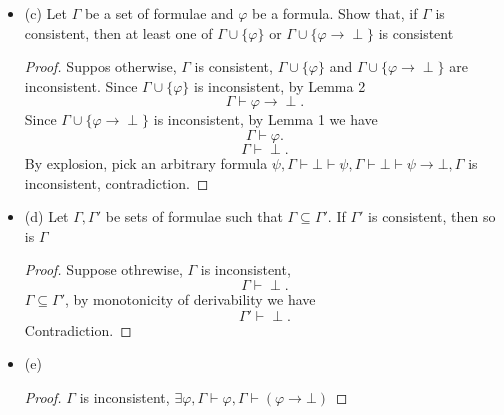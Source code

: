 \documentclass{article}
\begin{document}
\begin{itemize}
\begin{proof}
\begin{enumerate}
            \item $\Gamma \vdash \varphi \rightarrow \psi$
            \item $\Gamma \vdash \varphi \rightarrow (\psi \rightarrow \perp)$
            \item $\Gamma \vdash (\varphi \rightarrow (\psi \rightarrow \perp)) \rightarrow ((\varphi \rightarrow \psi) \rightarrow (\varphi \rightarrow \perp))$ (Ax 2)
            \item $\Gamma \vdash (\varphi \rightarrow \psi) \rightarrow (\varphi \rightarrow \perp)$ (MP 2, 3)
            \item $\Gamma \vdash \varphi \rightarrow \perp$ (MP 1, 4)
        \end{enumerate}
    \end{proof}
    \item (c) Let $\Gamma$ be a set of formulae and $\varphi$ be a formula. Show that, if $\Gamma$ is consistent, then at least one of $\Gamma \cup \{\varphi\}$ or $\Gamma \cup \{\varphi \rightarrow \perp\}$ is consistent
    \begin{proof}
        Suppos otherwise, $\Gamma$ is consistent, $\Gamma \cup \{\varphi\}$ and $\Gamma \cup \{\varphi \rightarrow \perp\}$ are inconsistent.
        Since $\Gamma \cup \{\varphi\}$ is inconsistent, by Lemma 2
        \[
        \Gamma \vdash \varphi \rightarrow \perp.
        \]
        Since $\Gamma \cup \{\varphi \rightarrow \perp\}$ is inconsistent, by Lemma 1 we have
        \[
        \Gamma \vdash \varphi.
        \]
        \[
        \Gamma \vdash \perp.
        \]
        By explosion, pick an arbitrary formula $\psi, 
        \Gamma \vdash \bot \vdash \psi, \Gamma \vdash \bot \vdash \psi \rightarrow \bot, \Gamma$ is inconsistent, contradiction.
        \end{proof}
    \item (d) Let $\Gamma, \Gamma'$ be sets of formulae such that $\Gamma \subseteq \Gamma'$. If $\Gamma'$ is consistent, then so is $\Gamma$
    \begin{proof}
        Suppose othrewise, $\Gamma$ is inconsistent,
        \[
        \Gamma \vdash \perp.
        \]
        $\Gamma \subseteq \Gamma'$, by monotonicity of derivability we have
        \[
        \Gamma' \vdash \perp.
        \]
        Contradiction.
        \end{proof}
    \item (e)
    \begin{proof}
        $\Gamma $ is inconsistent, $\exists \varphi,  \Gamma \vdash \varphi, \Gamma \vdash (\varphi \rightarrow \bot)$

\end{proof}
\end{itemize}
\end{document}

